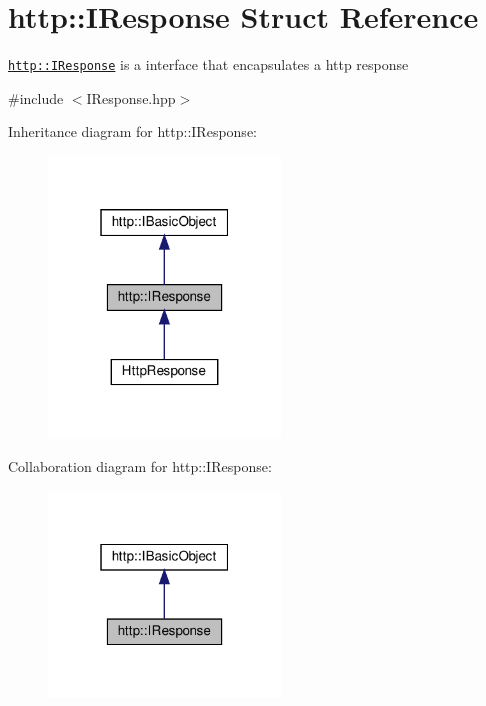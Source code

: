 \hypertarget{structhttp_1_1IResponse}{}\section{http\+:\+:I\+Response Struct Reference}
\label{structhttp_1_1IResponse}


\href{http::IResponse}{\tt http\+::\+I\+Response} is a interface that encapsulates a http response  




{\ttfamily \#include $<$I\+Response.\+hpp$>$}



Inheritance diagram for http\+:\+:I\+Response\+:
\nopagebreak
\begin{figure}[H]
\begin{center}
\leavevmode
\includegraphics[width=175pt]{structhttp_1_1IResponse__inherit__graph}
\end{center}
\end{figure}


Collaboration diagram for http\+:\+:I\+Response\+:
\nopagebreak
\begin{figure}[H]
\begin{center}
\leavevmode
\includegraphics[width=175pt]{structhttp_1_1IResponse__coll__graph}
\end{center}
\end{figure}
